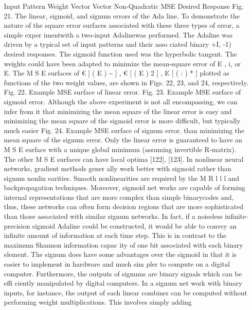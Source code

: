\documentclass[11pt,a4paper,twocolumn]{article}
\begin{document}
{%

Input Pattern 
Weight 
Vector 
Vector 
Non-Quadratic MSE 
Desired Response 
Fig. 21. The linear, sigmoid, and signum errors of the Ada
line. 
To demonstrate the nature of the square error surfaces 
associated with these three types of error, a simple exper
imentwith a two-input Adalinewas performed. The Adaline 
was driven by a typical set of input patterns and their asso
ciated binary { +I, -1) desired responses. The sigmoid 
function used was the hyperbolic tangent. The weights 
could have been adapted to minimize the mean-square 
error of E ,  i, or E. The M S E  surfaces of € [ ( E ) \~{} ] ,  € [ ( E ) 2 ] ,  E [ ( : ) * ]  
plotted as functions of the two weight values, are shown 
in Figs. 22, 23, and 24, respectively. 
Fig. 22. Example MSE surface of linear error. 
Fig. 23. Example MSE surface of sigmoid error. 
Although the above experiment is not all encompassing, 
we can infer from it that minimizing the mean square of the 
linear error is easy and minimizing the mean square of the 
sigmoid error is more difficult, but typically much easier 
Fig. 24. Example MSE surface of signum error. 
than minimizing the mean square of the signum error. Only 
the linear error is guaranteed to have an M S E  surface with 
a unique global minimum (assuming invertible R-matrix). 
The other M S E  surfaces can have local optima [122], [123]. 
In nonlinear neural networks, gradient methods gener
ally work better with sigmoid rather than signum nonlin
earities. Smooth nonlinearities are required by the M R l l l  
and backpropagation techniques. Moreover, sigmoid net
works are capable of forming internal representations that 
are more complex than simple binarycodes and, thus, these 
networks can often form decision regions that are more 
sophisticated than those associated with similar signum 
networks. In fact, if a noiseless infinite-precision sigmoid 
Adaline could be constructed, it would be able to convey 
an infinite amount of information at each time step. This 
is in contrast to the maximum Shannon information capac
ity of one bit associated with each binary element. 
The signum does have some advantages over the sigmoid 
in that it is easier to implement in hardware and much sim
pler to compute on a digital computer. Furthermore, the 
outputs of signums are binary signals which can be effi
ciently manipulated by digital computers. In a signum net
work with binary inputs, for instance, the output of each 
linear combiner can be computed without performing 
weight multiplications. This involves simply adding 
}}
\end{document}
